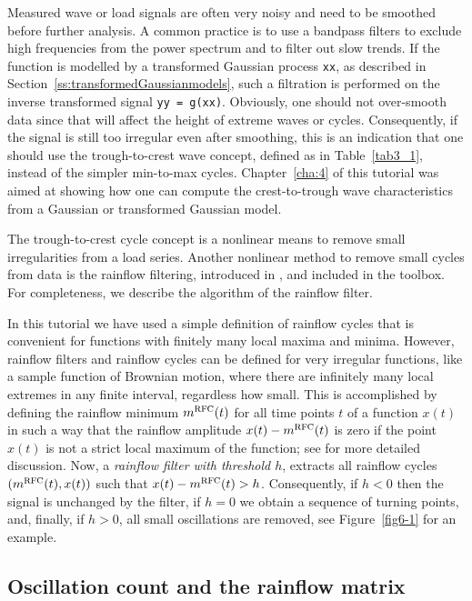 Measured wave or load signals are often very noisy and need to be smoothed
before further analysis. A common practice is to use a bandpass
filters to exclude high frequencies from the power spectrum and to
filter out slow trends. If the function is modelled by a transformed
Gaussian process {\tt xx},
as described in Section~\ref{ss:transformedGaussianmodels},
such a filtration is performed on the
inverse transformed signal {\tt yy = g(xx)}. Obviously, one should
not over-smooth data since that will affect the height of extreme
waves or cycles. Consequently, if the signal is still too irregular even after
smoothing, this is an indication that one should use the trough-to-crest
wave concept, defined as in Table~\ref{tab3_1}, instead of the simpler
min-to-max cycles. Chapter~\ref{cha:4} of this tutorial was aimed
at showing how one can compute the crest-to-trough wave
characteristics from a Gaussian or transformed Gaussian model.

The trough-to-crest cycle concept is a nonlinear means to remove small
irregularities from a load series. Another nonlinear method to remove
small cycles from data is the rainflow filtering, introduced in
\cite{Rychlik1995Simulation}, %
and included in the \progname{} toolbox. For completeness, we describe
the algorithm of the rainflow filter.

In this tutorial we have used a simple definition of rainflow
cycles that is convenient for functions with finitely many local maxima and
minima. However, rainflow filters and rainflow cycles can be defined
for very irregular functions, like a sample function of Brownian
motion, where there are infinitely many local extremes in any finite
interval, regardless how small. This is accomplished by defining the rainflow
minimum $m^{{\protect\mbox{\protect\small\protect\sc rfc}}}(t)$ for all time points $t$ of a function $x(t)$ in such a
way that the rainflow amplitude $x(t)-m^{{\protect\mbox{\protect\small\protect\sc rfc}}}(t)$ is zero if the
point $x(t)$ is not a strict local maximum of the function; see
\cite{Rychlik1995Simulation} for more detailed discussion. Now, a {\it rainflow
filter with threshold $h$}, extracts all rainflow cycles
$(m^{{\protect\mbox{\protect\small\protect\sc rfc}}}(t), x(t))$ such that $x(t)-m^{{\protect\mbox{\protect\small\protect\sc rfc}}}(t)>h$.
Consequently, if $h<0$ then the signal is unchanged by the filter,
if $h=0$ we obtain a sequence of turning points, and, finally,
if $h>0$,  all small oscillations are removed, see Figure~\ref{fig6-1}
for an example.

\subsection{Oscillation count and the rainflow matrix}
\label{sec:oscillationcount}

